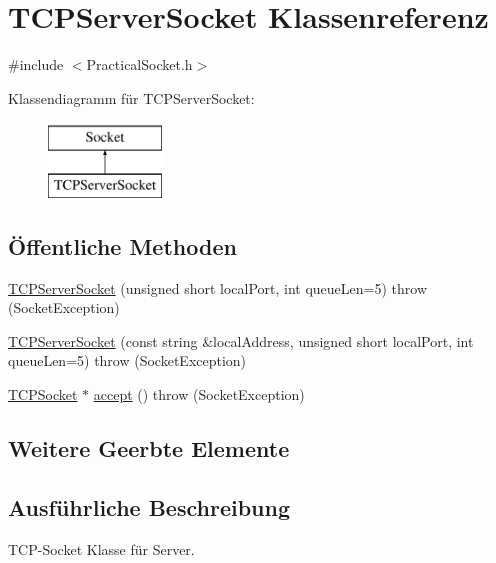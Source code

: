 \hypertarget{classTCPServerSocket}{\section{T\-C\-P\-Server\-Socket Klassenreferenz}
\label{classTCPServerSocket}
}


{\ttfamily \#include $<$Practical\-Socket.\-h$>$}

Klassendiagramm für T\-C\-P\-Server\-Socket\-:\begin{figure}[H]
\begin{center}
\leavevmode
\includegraphics[height=2.000000cm]{classTCPServerSocket}
\end{center}
\end{figure}
\subsection*{Öffentliche Methoden}
\begin{DoxyCompactItemize}
\item 
\hyperlink{classTCPServerSocket_ae559a3154527d09fe14a8e5ee1f53d7a}{T\-C\-P\-Server\-Socket} (unsigned short local\-Port, int queue\-Len=5)  throw (\-Socket\-Exception)
\item 
\hyperlink{classTCPServerSocket_a3908fecb1b038f7c14fcc7726f54d01d}{T\-C\-P\-Server\-Socket} (const string \&local\-Address, unsigned short local\-Port, int queue\-Len=5)  throw (\-Socket\-Exception)
\item 
\hyperlink{classTCPSocket}{T\-C\-P\-Socket} $\ast$ \hyperlink{classTCPServerSocket_a1d161137e1b069de7a7bfc14d3f8212c}{accept} ()  throw (\-Socket\-Exception)
\end{DoxyCompactItemize}
\subsection*{Weitere Geerbte Elemente}


\subsection{Ausführliche Beschreibung}
T\-C\-P-\/\-Socket Klasse für Server. 

